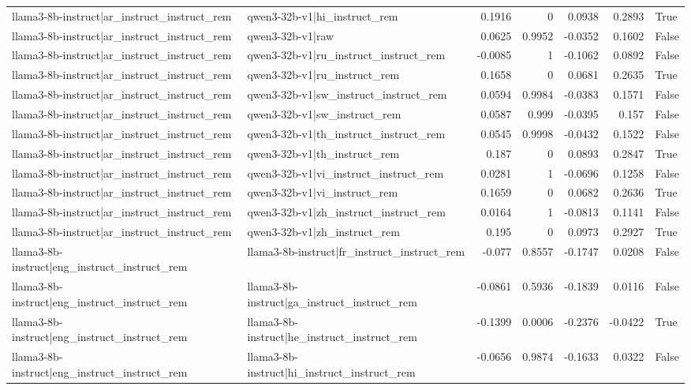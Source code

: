 \begin{table}
\begin{tabular}{l l r r r r l}
llama3-8b-instruct|ar_instruct_instruct_rem & qwen3-32b-v1|hi_instruct_rem & 0.1916 & 0 & 0.0938 & 0.2893 & True \\
llama3-8b-instruct|ar_instruct_instruct_rem & qwen3-32b-v1|raw & 0.0625 & 0.9952 & -0.0352 & 0.1602 & False \\
llama3-8b-instruct|ar_instruct_instruct_rem & qwen3-32b-v1|ru_instruct_instruct_rem & -0.0085 & 1 & -0.1062 & 0.0892 & False \\
llama3-8b-instruct|ar_instruct_instruct_rem & qwen3-32b-v1|ru_instruct_rem & 0.1658 & 0 & 0.0681 & 0.2635 & True \\
llama3-8b-instruct|ar_instruct_instruct_rem & qwen3-32b-v1|sw_instruct_instruct_rem & 0.0594 & 0.9984 & -0.0383 & 0.1571 & False \\
llama3-8b-instruct|ar_instruct_instruct_rem & qwen3-32b-v1|sw_instruct_rem & 0.0587 & 0.999 & -0.0395 & 0.157 & False \\
llama3-8b-instruct|ar_instruct_instruct_rem & qwen3-32b-v1|th_instruct_instruct_rem & 0.0545 & 0.9998 & -0.0432 & 0.1522 & False \\
llama3-8b-instruct|ar_instruct_instruct_rem & qwen3-32b-v1|th_instruct_rem & 0.187 & 0 & 0.0893 & 0.2847 & True \\
llama3-8b-instruct|ar_instruct_instruct_rem & qwen3-32b-v1|vi_instruct_instruct_rem & 0.0281 & 1 & -0.0696 & 0.1258 & False \\
llama3-8b-instruct|ar_instruct_instruct_rem & qwen3-32b-v1|vi_instruct_rem & 0.1659 & 0 & 0.0682 & 0.2636 & True \\
llama3-8b-instruct|ar_instruct_instruct_rem & qwen3-32b-v1|zh_instruct_instruct_rem & 0.0164 & 1 & -0.0813 & 0.1141 & False \\
llama3-8b-instruct|ar_instruct_instruct_rem & qwen3-32b-v1|zh_instruct_rem & 0.195 & 0 & 0.0973 & 0.2927 & True \\
llama3-8b-instruct|eng_instruct_instruct_rem & llama3-8b-instruct|fr_instruct_instruct_rem & -0.077 & 0.8557 & -0.1747 & 0.0208 & False \\
llama3-8b-instruct|eng_instruct_instruct_rem & llama3-8b-instruct|ga_instruct_instruct_rem & -0.0861 & 0.5936 & -0.1839 & 0.0116 & False \\
llama3-8b-instruct|eng_instruct_instruct_rem & llama3-8b-instruct|he_instruct_instruct_rem & -0.1399 & 0.0006 & -0.2376 & -0.0422 & True \\
llama3-8b-instruct|eng_instruct_instruct_rem & llama3-8b-instruct|hi_instruct_instruct_rem & -0.0656 & 0.9874 & -0.1633 & 0.0322 & False \\

\end{tabular}
\end{table}
